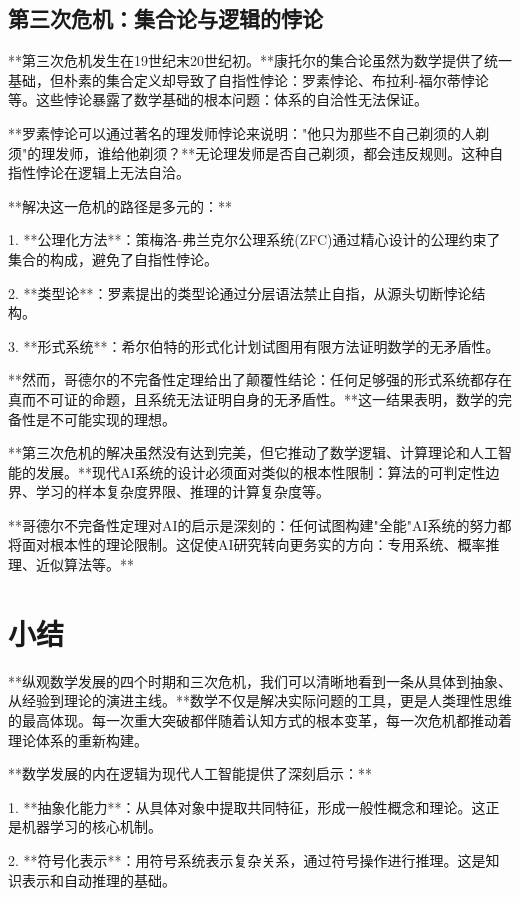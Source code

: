 \subsection{第三次危机：集合论与逻辑的悖论}

**第三次危机发生在19世纪末20世纪初。**康托尔的集合论虽然为数学提供了统一基础，但朴素的集合定义却导致了自指性悖论：罗素悖论、布拉利-福尔蒂悖论等。这些悖论暴露了数学基础的根本问题：体系的自洽性无法保证。

**罗素悖论可以通过著名的理发师悖论来说明："他只为那些不自己剃须的人剃须"的理发师，谁给他剃须？**无论理发师是否自己剃须，都会违反规则。这种自指性悖论在逻辑上无法自洽。

**解决这一危机的路径是多元的：**

1. **公理化方法**：策梅洛-弗兰克尔公理系统(ZFC)通过精心设计的公理约束了集合的构成，避免了自指性悖论。

2. **类型论**：罗素提出的类型论通过分层语法禁止自指，从源头切断悖论结构。

3. **形式系统**：希尔伯特的形式化计划试图用有限方法证明数学的无矛盾性。

**然而，哥德尔的不完备性定理给出了颠覆性结论：任何足够强的形式系统都存在真而不可证的命题，且系统无法证明自身的无矛盾性。**这一结果表明，数学的完备性是不可能实现的理想。

**第三次危机的解决虽然没有达到完美，但它推动了数学逻辑、计算理论和人工智能的发展。**现代AI系统的设计必须面对类似的根本性限制：算法的可判定性边界、学习的样本复杂度界限、推理的计算复杂度等。

**哥德尔不完备性定理对AI的启示是深刻的：任何试图构建"全能"AI系统的努力都将面对根本性的理论限制。这促使AI研究转向更务实的方向：专用系统、概率推理、近似算法等。**

\section{小结}

**纵观数学发展的四个时期和三次危机，我们可以清晰地看到一条从具体到抽象、从经验到理论的演进主线。**数学不仅是解决实际问题的工具，更是人类理性思维的最高体现。每一次重大突破都伴随着认知方式的根本变革，每一次危机都推动着理论体系的重新构建。

**数学发展的内在逻辑为现代人工智能提供了深刻启示：**

1. **抽象化能力**：从具体对象中提取共同特征，形成一般性概念和理论。这正是机器学习的核心机制。

2. **符号化表示**：用符号系统表示复杂关系，通过符号操作进行推理。这是知识表示和自动推理的基础。

